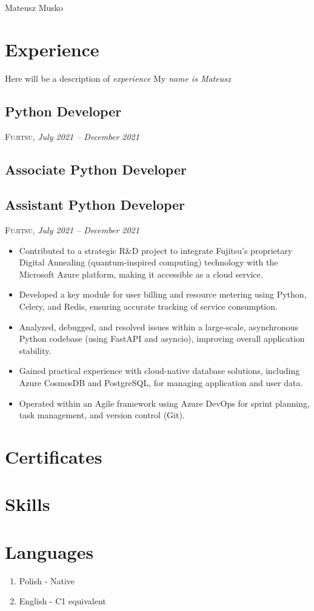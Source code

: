 \documentclass[a4paper, 12pt]{article} %
\begin{document}
Mateusz Musko


\section{Experience}
Here will be a description of \emph{experience} %
My \emph{name is \emph{Mateusz}} %

\subsection{Python Developer}
\textsc{Fujitsu}, \textit{July 2021 – December 2021} \\

\subsection{Associate Python Developer}
\subsection{Assistant Python Developer}
\textsc{Fujitsu}, \textit{July 2021 – December 2021} \\
\begin{itemize}
    \itemsep -0.3em %
    \item Contributed to a strategic R\&D project to integrate Fujitsu's proprietary Digital Annealing (quantum-inspired computing) technology with the Microsoft Azure platform, making it accessible as a cloud service.
    \item Developed a key module for user billing and resource metering using Python, Celery, and Redis, ensuring accurate tracking of service consumption.
    \item Analyzed, debugged, and resolved issues within a large-scale, asynchronous Python codebase (using FastAPI and asyncio), improving overall application stability.
    \item Gained practical experience with cloud-native database solutions, including Azure CosmosDB and PostgreSQL, for managing application and user data.
    \item Operated within an Agile framework using Azure DevOps for sprint planning, task management, and version control (Git).
\end{itemize}

\section{Certificates}

\section{Skills}

\section{Languages}
\begin{enumerate} %
    \item Polish - Native
    \item English - C1 equivalent
\end{enumerate}
\end{document}
